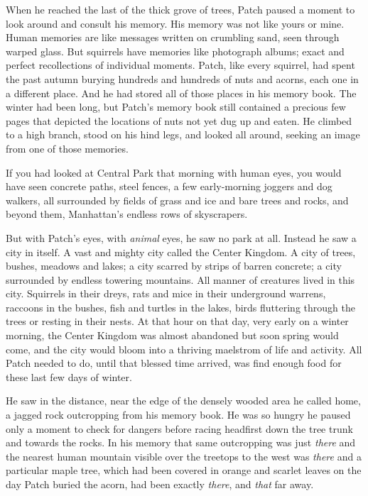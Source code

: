 \documentclass[12pt]{book}
\begin{document}
 When he reached the last of the thick grove of trees, Patch paused a moment to look around and consult his memory. His memory was not like yours or mine. Human memories are like messages written on crumbling sand, seen through warped glass. But squirrels have memories like photograph albums; exact and perfect recollections of individual moments. Patch, like every squirrel, had spent the past autumn burying hundreds and hundreds of nuts and acorns, each one in a different place. And he had stored all of those places in his memory book. The winter had been long, but Patch's memory book still contained a precious few pages that depicted the locations of nuts not yet dug up and eaten. He climbed to a high branch, stood on his hind legs, and looked all around, seeking an image from one of those memories.\par
 If you had looked at Central Park that morning with human eyes, you would have seen concrete paths, steel fences, a few early-morning joggers and dog walkers, all surrounded by fields of grass and ice and bare trees and rocks, and beyond them, Manhattan's endless rows of skyscrapers.\par
But with Patch's eyes, with {\it animal} eyes, he saw no park at all. Instead he saw a city in itself. A vast and mighty city called the Center Kingdom. A city of trees, bushes, meadows and lakes; a city scarred by strips of barren concrete; a city surrounded by endless towering mountains. All manner of creatures lived in this city. Squirrels in their dreys, rats and mice in their underground warrens, raccoons in the bushes, fish and turtles in the lakes, birds fluttering through the trees or resting in their nests. At that hour on that day, very early on a winter morning, the Center Kingdom was almost abandoned %
 but soon spring would come, and the city would bloom into a thriving maelstrom of life and activity. All Patch needed to do, until that blessed time arrived, was find enough food for these last few days of winter.\par
 He saw in the distance, near the edge of the densely wooded area he called home, a jagged rock outcropping from his memory book. He was so hungry he paused only a moment to check for dangers before racing headfirst down the tree trunk and towards the rocks. In his memory that same outcropping was just {\it there} %
 and the nearest human mountain visible over the treetops to the west was {\it there} %
 and a particular maple tree, which had been covered in orange and scarlet leaves on the day Patch buried the acorn, had been exactly {\it there}, and {\it that} far away.\par
\end{document}
